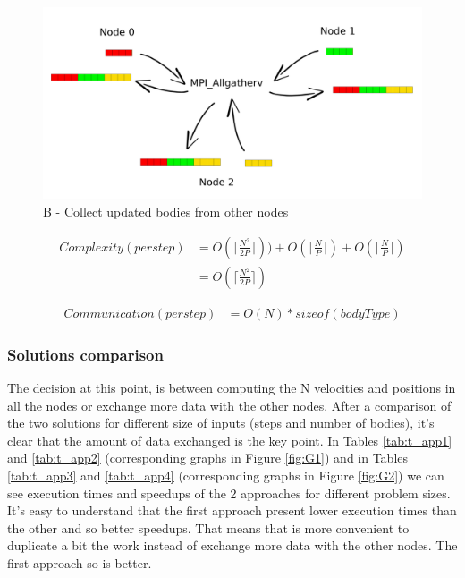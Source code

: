 \documentclass[a4paper]{article}
\begin{document}
\begin{figure}[ht]
  \centering
  \includegraphics[width=0.6\linewidth]{MPI_all_gather}
  \caption{B - Collect updated bodies from other nodes}
  \label{fig:B1}
\end{figure}
\FloatBarrier


\begin{equation} \label{eq:comp_app2}
\begin{split}
Complexity (per step) & = O(\lceil\frac{N^2}{2P}\rceil)) + O(\lceil\frac{N}{P}\rceil) + O(\lceil\frac{N}{P}\rceil)\\
 & = O(\lceil\frac{N^2}{2P}\rceil)
\end{split}
\end{equation}

\begin{equation} \label{eq:com_app2}
\begin{split}
Communication (per step) & = O(N)*sizeof(bodyType)
\end{split}
\end{equation}


\subsubsection{Solutions comparison}
\label{sec:sol_comp}
The decision at this point, is between computing the N velocities and positions in all the nodes or exchange more data with the other nodes. 
After a comparison of the two solutions for different size of inputs (steps and number of bodies), it's clear that the amount of data exchanged is the key point. In Tables \ref{tab:t_app1} and \ref{tab:t_app2} (corresponding graphs in Figure \ref{fig:G1}) and in Tables \ref{tab:t_app3} and \ref{tab:t_app4} (corresponding graphs in Figure \ref{fig:G2}) we can see execution times and speedups of the 2 approaches for different problem sizes. It's easy to understand that the first approach present lower execution times than the other and so better speedups. That means that is more convenient to duplicate a bit the work instead of exchange more data with the other nodes. The first approach so is better.
\\
\end{document}
